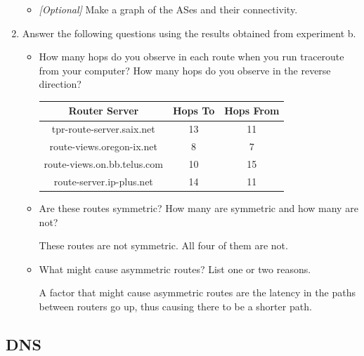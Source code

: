 \documentclass[10pt]{article}
\begin{document}
\begin{enumerate}
\begin{itemize}
\item \emph{[Optional]} Make a graph of the ASes and their connectivity.

\end{itemize}

\item Answer the following questions using the results obtained from experiment b.

\begin{itemize}

\item How many hops do you observe in each route when you run traceroute from your computer? How many hops do you observe in the reverse direction?

\begin{center}
\begin{tabular}{ || c | c | c || }
\hline
Router Server & Hops To & Hops From \\
\hline \hline
tpr-route-server.saix.net & 13 & 11 \\
\hline
route-views.oregon-ix.net & 8 & 7 \\
\hline
route-views.on.bb.telus.com & 10 & 15 \\
\hline
route-server.ip-plus.net & 14 & 11 \\
\hline
\end{tabular}
\end{center}

\item Are these routes symmetric? How many are symmetric and how many are not?

These routes are not symmetric. All four of them are not.

\item What might cause asymmetric routes? List one or two reasons.

A factor that might cause asymmetric routes are the latency in the paths between routers go up, thus causing there to be a shorter path.

\end{itemize}
\end{enumerate}

\subsection*{DNS}
\end{document}
